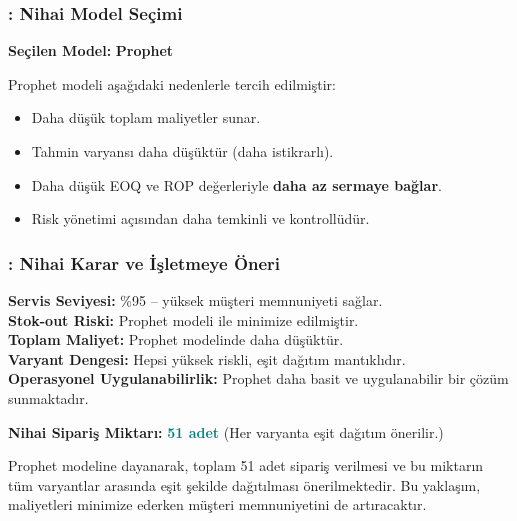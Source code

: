 \documentclass[12pt]{beamer}
\begin{document}
\begin{frame}
	\frametitle{\insertsection: Nihai Model Seçimi}

	\textbf{Seçilen Model:} \textcolor{blue!80!black}{\textbf{Prophet}}

	\vspace{0.4cm}
	Prophet modeli aşağıdaki nedenlerle tercih edilmiştir:

	\begin{itemize}
		\item Daha düşük toplam maliyetler sunar.
		\item Tahmin varyansı daha düşüktür (daha istikrarlı).
		\item Daha düşük EOQ ve ROP değerleriyle \textbf{daha az
			      sermaye bağlar}.
		\item Risk yönetimi açısından daha temkinli ve kontrollüdür.
	\end{itemize}
\end{frame}

\begin{frame}
	\frametitle{\insertsection: Nihai Karar ve İşletmeye Öneri}

	\textbf{Servis Seviyesi:} \%95 – yüksek müşteri memnuniyeti sağlar. \\
	\textbf{Stok-out Riski:} Prophet modeli ile minimize edilmiştir. \\
	\textbf{Toplam Maliyet:} Prophet modelinde daha düşüktür. \\
	\textbf{Varyant Dengesi:} Hepsi yüksek riskli, eşit dağıtım
	mantıklıdır. \\
	\textbf{Operasyonel Uygulanabilirlik:} Prophet daha basit ve
	uygulanabilir bir çözüm sunmaktadır.

	\vspace{0.5cm}
	\textbf{Nihai Sipariş Miktarı:} \textcolor{teal}{\textbf{51 adet}}
	(Her varyanta eşit dağıtım önerilir.)

	\vspace{0.4cm}
	\begin{tcolorbox}
		Prophet modeline dayanarak, toplam 51 adet sipariş verilmesi ve
		bu miktarın tüm varyantlar arasında eşit şekilde dağıtılması önerilmektedir. Bu
		yaklaşım, maliyetleri minimize ederken müşteri memnuniyetini de artıracaktır.
	\end{tcolorbox}
\end{frame}
\end{document}
